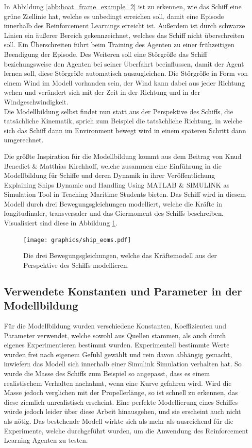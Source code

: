 \documentclass[]{iat}
\begin{document}
In Abbildung \ref*{abb:boat_frame_example_2} ist zu erkennen, wie das Schiff eine grüne Ziellinie hat, welche es unbedingt erreichen soll, damit eine Episode innerhalb des Reinforcement Learnings erreicht ist. Außerdem ist durch schwarze Linien ein äußerer Bereich gekennzeichnet, welches das Schiff nicht überschreiten soll. Ein Überschreiten führt beim Training des Agenten zu einer frühzeitigen Beendigung der Episode. Des Weiteren soll eine Störgröße das Schiff beziehungsweise den Agenten bei seiner Überfahrt beeinflussen, damit der Agent lernen soll, diese Störgröße automatisch auszugleichen. Die Störgröße in Form von einem Wind im Modell vorhanden sein, der Wind kann dabei aus jeder Richtung wehen und verändert sich mit der Zeit in der Richtung und in der Windgeschwindigkeit.\\
Die Modellbildung selbst findet nun statt aus der Perspektive des Schiffs, die tatsächliche Kinematik, sprich zum Beispiel die tatsächliche Richtung, in welche sich das Schiff dann im Environment bewegt wird in einem späteren Schritt dann umgerechnet.

Die größte Inspiration für die Modellbildung kommt aus dem Beitrag von Knud Benedict \& Matthias Kirchhoff, welche zusammen eine Einführung in die Modellbildung für Schiffe und deren Dynamik in ihrer Veröffentlichung \glqq Explaining Ships Dynamic and Handling Using MATLAB \& SIMULINK as Simulation Tool in Teaching Maritime Students\grqq{} \cite[]{Benedict2007ExplainingSD} bieten. Das Schiff wird in diesem Modell durch drei Bewegungsgleichungen modelliert, welche die Kräfte in longitudinaler, transversaler und das Giermoment des Schiffs beschreiben. Visualisiert sind diese in Abbildung \ref{abb:ship_eoms}.
\begin{figure}[H]
    \texttt{[image: graphics/ship\_eoms.pdf]}
    \centering
    \caption{Die drei Bewegungsgleichungen, welche das Kräftemodell aus der Perspektive des Schiffs modellieren.}
    \label{abb:ship_eoms}
\end{figure}

\subsection{Verwendete Konstanten und Parameter in der Modellbildung}
Für die Modellbildung wurden verschiedene Konstanten, Koeffizienten und Parameter verwendet, welche sowohl aus Quellen stammen, als auch durch eigenes Experimentieren bestimmt wurden. Experimentell bestimmte Werte wurden frei nach eigenem Gefühl gewählt und rein davon abhängig gemacht, inwiefern das Modell sich innerhalb einer Simulink Simulation verhalten hat. So wurde die Masse des Schiffs zum Beispiel so angepasst, dass es einem \glqq realistischem\grqq{} Verhalten nachahmt, wenn eine Kurve gefahren wird. Wird die Masse jedoch verglichen mit der Propellerlänge, so ist schnell zu erkennen, das diese ziemlich unrealistisch erscheint. Eine perfekte Modellierung eines Schiffes würde jedoch leider über diese Arbeit hinausgehen, und sie erscheint auch nicht als nötig. Das bestehende Modell wirkte sich als mehr als ausreichend für die Experimente, welche durchgeführt wurden, um die Anwendung des Reinforcement Learning Agenten zu testen.
\end{document}
